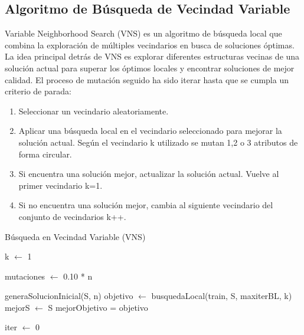 \subsection{Algoritmo de Búsqueda de Vecindad Variable}
Variable Neighborhood Search (VNS) es un algoritmo de búsqueda local que combina la exploración de múltiples vecindarios en busca de soluciones óptimas. La idea principal detrás de VNS es explorar diferentes estructuras vecinas de una solución actual para superar los óptimos locales y encontrar soluciones de mejor calidad. El proceso de mutación seguido ha sido iterar hasta que se cumpla un criterio de parada:
\begin{enumerate}
	\item Seleccionar un vecindario aleatoriamente. 
	\item  Aplicar una búsqueda local en el vecindario seleccionado para mejorar la solución actual. Según el vecindario k utilizado se mutan 1,2 o 3 atributos de forma circular.
	\item  Si encuentra una solución mejor, actualizar la solución actual. Vuelve al primer vecindario k=1.
	\item  Si no encuentra una solución mejor, cambia al siguiente vecindario del conjunto de vecindarios  k++.
\end{enumerate}

\begin{algorithm}[H]
	\caption{Búsqueda en Vecindad Variable (VNS)}
	
	
	k $\leftarrow$ 1\; 
	
	mutaciones $\leftarrow$ 0.10 * n\;
	
	generaSolucionInicial(S, n)\;
	objetivo $\leftarrow$ busquedaLocal(train, S, maxiterBL, k)\;
	mejorS $\leftarrow$ S\;
	mejorObjetivo = objetivo\;
	
	iter $\leftarrow$ 0\;
	
	\;
\end{algorithm}


